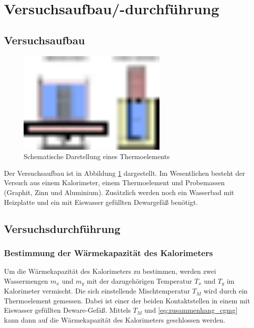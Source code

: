 \section{Versuchsaufbau/-durchführung}

\subsection{Versuchsaufbau}
\begin{figure}
  \centering
  \includegraphics[width=0.65\textwidth]{bilder/versuchsaufbau_dulon_peptip.pdf}
  \caption{Schematische Darstellung eines Thermoelements}
  \label{fig:aufbau}
\end{figure}
Der Versuchsaufbau ist in Abbildung \ref{fig:aufbau} dargestellt.
Im Wesentlichen besteht der Versuch aus einem Kalorimeter, einem Thermoelement und %
Probemassen (Graphit, Zinn und Aluminium). %
Zusätzlich werden noch ein Wasserbad mit Heizplatte und
ein mit Eiswasser gefüllten Dewargefäß benötigt.

\subsection{Versuchsdurchführung}

\subsubsection{Bestimmung der Wärmekapazität des Kalorimeters}
Um die Wärmekapazität des Kalorimeters zu bestimmen, werden
zwei Wassermengen $m_x$ und $m_y$ mit der dazugehörigen Temperatur $T_x$ und $T_y$
im Kalorimeter vermischt.
Die sich einstellende Mischtemperatur $T_M$ wird durch ein Thermoelement gemessen.
Dabei ist einer der beiden Kontaktstellen %
in einem mit Eiswasser gefüllten Deware-Gefäß.
Mittels $T_M$ und \eqref{eq:zusammenhang_cgmg} kann dann auf die Wärmekapazität des
Kalorimeters geschlossen werden. %

